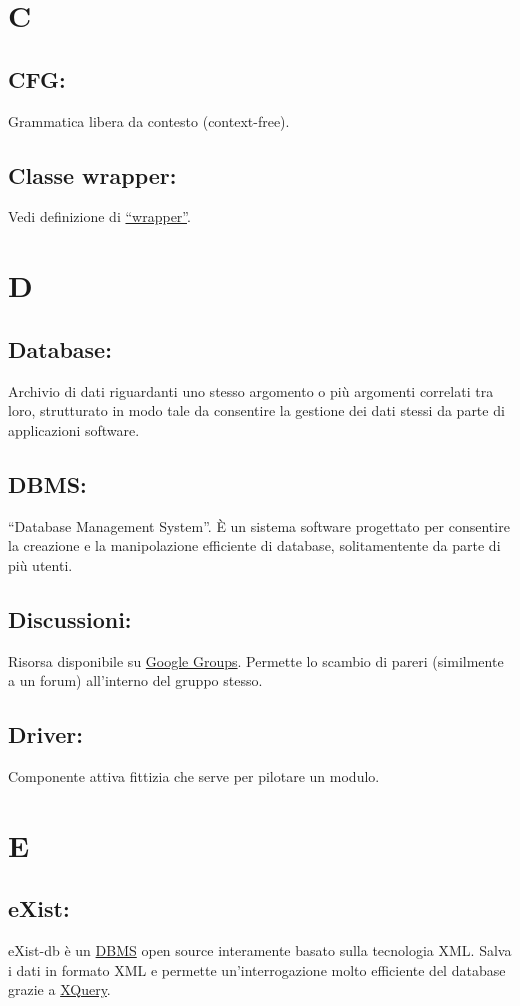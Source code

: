 \chapter{C}
\section{CFG:}
Grammatica libera da contesto (context-free). 
\section{Classe wrapper:}
Vedi definizione di \hyperlink{wrapper}{``wrapper''}.

\chapter{D}
\section{Database:}
Archivio di dati riguardanti uno stesso argomento o pi\`u argomenti correlati tra loro, strutturato in modo tale da consentire la gestione dei dati stessi da parte di applicazioni software.
\section{DBMS:}
``Database Management System''. \`E un sistema software progettato per consentire la creazione e la manipolazione efficiente di database, solitamentente da parte di pi\`u utenti.
\section{Discussioni:}
Risorsa disponibile su  \hyperlink{Google Groups}{Google Groups}. Permette lo scambio di pareri (similmente a un forum) all'interno del gruppo stesso.
\section{Driver:}
Componente attiva fittizia che serve per pilotare un modulo.

\chapter{E}
\section{eXist:}
eXist-db \`e un \hyperlink{DBMS}{DBMS} open source interamente basato sulla tecnologia XML. Salva i dati in formato XML e permette un'interrogazione molto efficiente del database grazie a \hyperlink{XQuery}{XQuery}.

